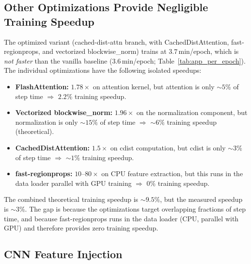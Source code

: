 \subsection{Other Optimizations Provide Negligible Training Speedup}

The optimized variant (cached-dist-attn branch, with CachedDistAttention, fast-regionprops, and vectorized blockwise\_norm) trains at $3.7$\,min/epoch, which is \emph{not faster} than the vanilla baseline ($3.6$\,min/epoch; Table~\ref{tab:app_per_epoch}). The individual optimizations have the following isolated speedups:

\begin{itemize}[noitemsep]
    \item \textbf{FlashAttention:} $1.78\times$ on attention kernel, but attention is only $\sim 5\%$ of step time $\Rightarrow$ $2.2\%$ training speedup.
    \item \textbf{Vectorized blockwise\_norm:} $1.96\times$ on the normalization component, but normalization is only $\sim 15\%$ of step time $\Rightarrow$ $\sim 6\%$ training speedup (theoretical).
    \item \textbf{CachedDistAttention:} $1.5\times$ on cdist computation, but cdist is only $\sim 3\%$ of step time $\Rightarrow$ $\sim 1\%$ training speedup.
    \item \textbf{fast-regionprops:} $10$--$80\times$ on CPU feature extraction, but this runs in the data loader parallel with GPU training $\Rightarrow$ $0\%$ training speedup.
\end{itemize}

The combined theoretical training speedup is $\sim 9.5\%$, but the measured speedup is $\sim 3\%$. The gap is because the optimizations target overlapping fractions of step time, and because fast-regionprops runs in the data loader (CPU, parallel with GPU) and therefore provides zero training speedup.

\subsection{CNN Feature Injection}

